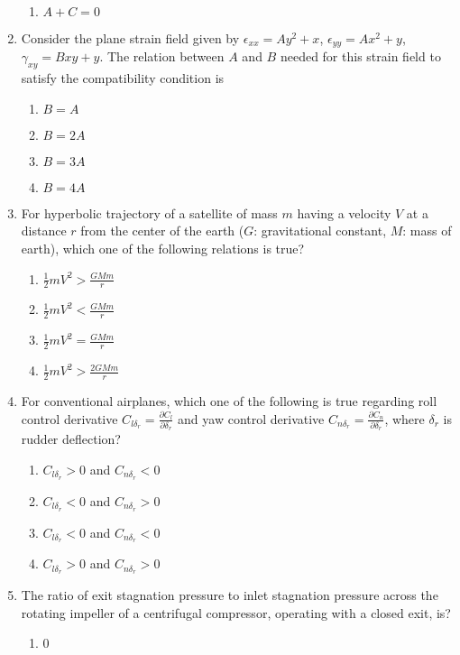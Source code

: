 \documentclass[journal]{IEEEtran}
\begin{document}
\begin{enumerate}
\begin{enumerate}
			\item $A + C = 0$
		\end{enumerate}
	\item
	Consider the plane strain field given by $\epsilon_{xx} = Ay^{2} + x$, $\epsilon_{yy} = Ax^{2} + y$, $\gamma_{xy} = Bxy + y$. The relation between $A$ and $B$ needed for this strain field to satisfy the compatibility condition is
		\begin{enumerate}
			\item $B = A$
			\item $B = 2A$
			\item $B = 3A$
			\item $B = 4A$
		\end{enumerate}
	\item
	For hyperbolic trajectory of a satellite of mass $m$ having a velocity $V$ at a distance $r$ from the center of the earth ($G$: gravitational constant, $M$: mass of earth), which one of the following relations is true?
		\begin{enumerate}
			\item $\frac{1}{2}mV^{2} > \frac{GMm}{r}$
			\item $\frac{1}{2}mV^{2} < \frac{GMm}{r}$
			\item $\frac{1}{2}mV^{2} = \frac{GMm}{r}$
			\item $\frac{1}{2}mV^{2} > \frac{2GMm}{r}$
		\end{enumerate}	
	\item 
	For conventional airplanes, which one of the following is true regarding roll control derivative $C_{l\delta_{r}} = \frac{\partial C_{l}}{\partial \delta_{r}}$ and yaw control derivative $C_{n\delta_{r}} = \frac{\partial C_{n}}{\partial \delta_{r}}$, where $\delta_{r}$ is rudder deflection?
		\begin{enumerate}
			\item $C_{l\delta_{r}} > 0$ and $C_{n\delta_{r}} < 0$
			\item $C_{l\delta_{r}} < 0$ and $C_{n\delta_{r}} > 0$
			\item $C_{l\delta_{r}} < 0$ and $C_{n\delta_{r}} < 0$
			\item $C_{l\delta_{r}} > 0$ and $C_{n\delta_{r}} > 0$
		\end{enumerate}
	\item
	The ratio of exit stagnation pressure to inlet stagnation pressure across the rotating impeller of a centrifugal compressor, operating with a closed exit, is?
		\begin{enumerate}
			\item 0

\end{enumerate}
\end{enumerate}
\end{document}
